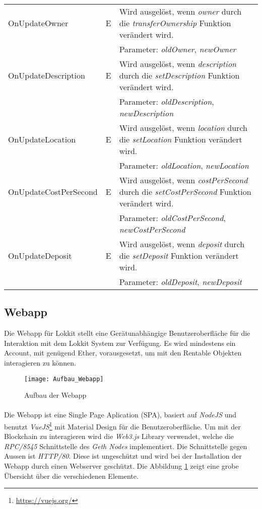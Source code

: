 \begin{longtable}{@{}lcL{9cm}@{}}
OnUpdateOwner              & E   & Wird ausgelöst, wenn \emph{owner} durch die \emph{transferOwnership} Funktion verändert wird.\\ & & Parameter: \emph{oldOwner}, \emph{newOwner} \\ \midrule
OnUpdateDescription              & E   & Wird ausgelöst, wenn \emph{description} durch die \emph{setDescription} Funktion verändert wird.\\ & & Parameter: \emph{oldDescription}, \emph{newDescription} \\ \midrule
OnUpdateLocation              & E   & Wird ausgelöst, wenn \emph{location} durch die \emph{setLocation} Funktion verändert wird.\\ & & Parameter: \emph{oldLocation}, \emph{newLocation} \\ \midrule
OnUpdateCostPerSecond              & E   & Wird ausgelöst, wenn \emph{costPerSecond} durch die \emph{setCostPerSecond} Funktion verändert wird.\\ & & Parameter: \emph{oldCostPerSecond}, \emph{newCostPerSecond} \\ \midrule
OnUpdateDeposit              & E   & Wird ausgelöst, wenn \emph{deposit} durch die \emph{setDeposit} Funktion verändert wird.\\ & & Parameter: \emph{oldDeposit}, \emph{newDeposit} \\
\bottomrule
\end{longtable}


\subsection{Webapp}
\label{sys_subsec:Webapp}

Die Webapp für Lokkit stellt eine Gerätunabhängige Benutzeroberfläche für die Interaktion mit dem Lokkit System zur Verfügung. Es wird mindestens ein Account, mit genügend Ether, vorausgesetzt, um mit den Rentable Objekten interagieren zu können.

\begin{figure}[H]
\centering
\texttt{[image: Aufbau\_Webapp]}
\caption{Aufbau der Webapp}
\label{fig:Aufbau der Webapp}
\end{figure}

\paragraph{}
Die Webapp ist eine Single Page Aplication (SPA), basiert auf \emph{NodeJS} und benutzt \emph{VueJS}\footnote{\url{https://vuejs.org/}} mit Material Design für die Benutzeroberfläche. Um mit der Blockchain zu interagieren wird die \emph{Web3.js} Library verwendet, welche die \emph{RPC/8545} Schnittstelle des \emph{Geth Nodes} implementiert. 
Die Schnittstelle gegen Aussen ist \emph{HTTP/80}. Diese ist ungeschützt und wird bei der Installation der Webapp durch einen Webserver geschützt. Die Abbildung \ref{fig:Aufbau der Webapp} zeigt eine grobe Übersicht über die verschiedenen Elemente.


